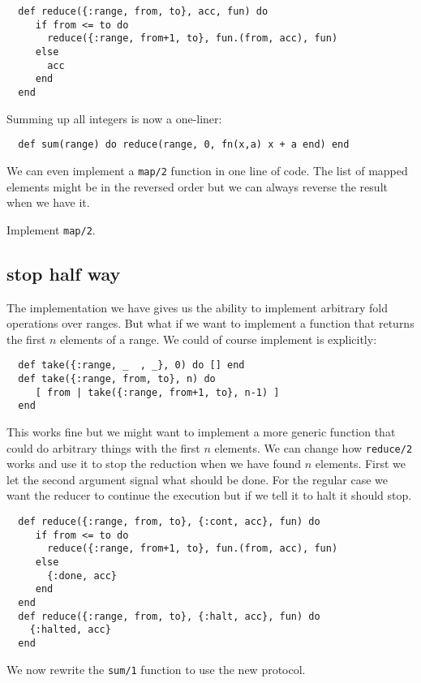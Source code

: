 \documentclass[a4paper,11pt]{article}
\begin{document}
\begin{verbatim}
  def reduce({:range, from, to}, acc, fun) do
     if from <= to do
       reduce({:range, from+1, to}, fun.(from, acc), fun)
     else 
       acc
     end
  end
\end{verbatim}

\noindent Summing up all integers is now a one-liner:

\begin{verbatim}
  def sum(range) do reduce(range, 0, fn(x,a) x + a end) end
\end{verbatim}

\noindent We can even implement a {\tt map/2} function in one line of
code. The list of mapped elements might be in the reversed order but we
can always reverse the result when we have it.

\noindent Implement {\tt map/2}. 

\subsection{stop half way}

The implementation we have gives us the ability to implement arbitrary
fold operations over ranges. But what if we want to implement a
function that returns the first $n$ elements of a range. We could of
course implement is explicitly:

\begin{verbatim}
  def take({:range, _  , _}, 0) do [] end
  def take({:range, from, to}, n) do
     [ from | take({:range, from+1, to}, n-1) ]
  end  
\end{verbatim}

This works fine but we might want to implement a more generic function
that could do arbitrary things with the first $n$ elements. We can
change how {\tt reduce/2} works and use it to stop the reduction when
we have found $n$ elements. First we let the second argument signal
what should be done. For the regular case we want the reducer to
continue the execution but if we tell it to halt it should stop.

\begin{verbatim}
  def reduce({:range, from, to}, {:cont, acc}, fun) do
     if from <= to do
       reduce({:range, from+1, to}, fun.(from, acc), fun)
     else 
       {:done, acc}
     end
  end
  def reduce({:range, from, to}, {:halt, acc}, fun) do
    {:halted, acc}
  end
\end{verbatim}

\noindent We now rewrite the {\tt sum/1} function to use the new protocol.
\end{document}

